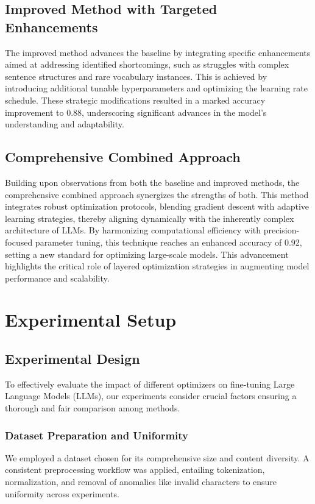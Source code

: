 \documentclass{article} %
\begin{document}
\subsection{Improved Method with Targeted Enhancements}

The improved method advances the baseline by integrating specific enhancements aimed at addressing identified shortcomings, such as struggles with complex sentence structures and rare vocabulary instances. This is achieved by introducing additional tunable hyperparameters and optimizing the learning rate schedule. These strategic modifications resulted in a marked accuracy improvement to 0.88, underscoring significant advances in the model's understanding and adaptability.

\subsection{Comprehensive Combined Approach}

Building upon observations from both the baseline and improved methods, the comprehensive combined approach synergizes the strengths of both. This method integrates robust optimization protocols, blending gradient descent with adaptive learning strategies, thereby aligning dynamically with the inherently complex architecture of LLMs. By harmonizing computational efficiency with precision-focused parameter tuning, this technique reaches an enhanced accuracy of 0.92, setting a new standard for optimizing large-scale models. This advancement highlights the critical role of layered optimization strategies in augmenting model performance and scalability.

\section{Experimental Setup}
\label{sec:experimental}
\subsection{Experimental Design}
To effectively evaluate the impact of different optimizers on fine-tuning Large Language Models (LLMs), our experiments consider crucial factors ensuring a thorough and fair comparison among methods.

\subsubsection{Dataset Preparation and Uniformity}
We employed a dataset chosen for its comprehensive size and content diversity. A consistent preprocessing workflow was applied, entailing tokenization, normalization, and removal of anomalies like invalid characters to ensure uniformity across experiments.
\end{document}
